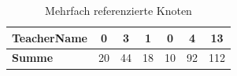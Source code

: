 \begin{table}[htb]
\begin{tabular}{|l|c|c|c|c|c|c|}
            TeacherName                           & 0             & 3              & 1               & 0             & 4              & 13            \\ \hline
            \hline
            \textbf{Summe}                        & 20            & 44             & 18              & 10            & 92             & 112           \\ \hline
        \end{tabular}
        \caption{Mehrfach referenzierte Knoten}
        \label{table:findingsTeachersFiguresSharedNodes}
    \end{table}
